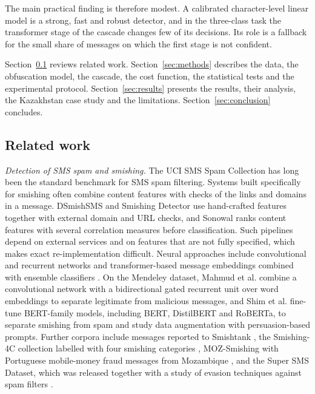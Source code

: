 The main practical finding is therefore modest. A calibrated character-level linear model is a strong, fast and robust detector, and in the three-class task the transformer stage of the cascade changes few of its decisions. Its role is a fallback for the small share of messages on which the first stage is not confident.

Section~\ref{sec:related} reviews related work. Section~\ref{sec:methods} describes the data, the obfuscation model, the cascade, the cost function, the statistical tests and the experimental protocol. Section~\ref{sec:results} presents the results, their analysis, the Kazakhstan case study and the limitations. Section~\ref{sec:conclusion} concludes.

\subsection{Related work}\label{sec:related}

\emph{Detection of SMS spam and smishing.} The UCI SMS Spam Collection \cite{almeida2011} has long been the standard benchmark for SMS spam filtering. Systems built specifically for smishing often combine content features with checks of the links and domains in a message. DSmishSMS \cite{mishra2023dsmishsms} and Smishing Detector \cite{mishra2022detector} use hand-crafted features together with external domain and URL checks, and Sonowal \cite{sonowal2020} ranks content features with several correlation measures before classification. Such pipelines depend on external services and on features that are not fully specified, which makes exact re-implementation difficult. Neural approaches include convolutional and recurrent networks \cite{roy2020} and transformer-based message embeddings combined with ensemble classifiers \cite{ghourabi2023}. On the Mendeley dataset, Mahmud et al. \cite{mahmud2024} combine a convolutional network with a bidirectional gated recurrent unit over word embeddings to separate legitimate from malicious messages, and Shim et al. \cite{shim2024} fine-tune BERT-family models, including BERT, DistilBERT and RoBERTa, to separate smishing from spam and study data augmentation with persuasion-based prompts. Further corpora include messages reported to Smishtank \cite{timko2024}, the Smishing-4C collection labelled with four smishing categories \cite{smishing4c2024}, MOZ-Smishing with Portuguese mobile-money fraud messages from Mozambique \cite{moz2025}, and the Super SMS Dataset, which was released together with a study of evasion techniques against spam filters \cite{salman2024}.

